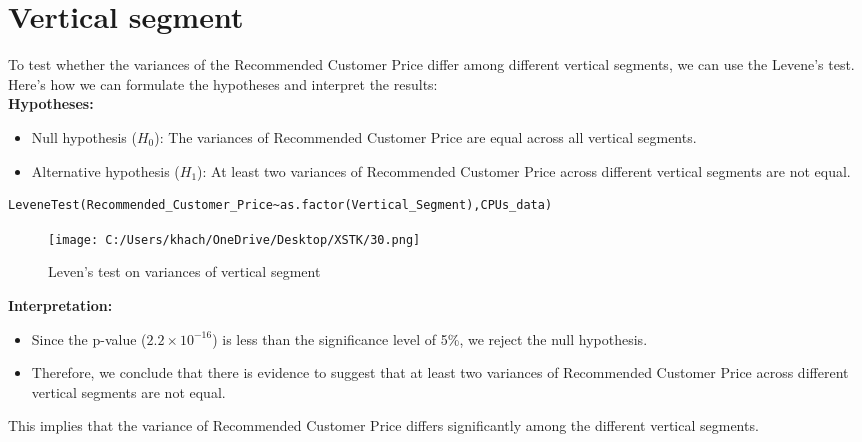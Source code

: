 \documentclass[a4paper]{article}
\begin{document}
	\section*{Vertical segment}
	 To test whether the variances of the Recommended Customer Price differ among different vertical segments, we can use the Levene's test. Here's how we can formulate the hypotheses and interpret the results:\\
	 \textbf{Hypotheses:}
	 \begin{itemize}
	 	\item Null hypothesis (\( H_0 \)): The variances of Recommended Customer Price are equal across all vertical segments.
	 	\item Alternative hypothesis (\( H_1 \)): At least two variances of Recommended Customer Price across different vertical segments are not equal.
	 \end{itemize}
	 \begin{lstlisting}[frame=single, backgroundcolor=\color{gray!10}, breaklines=true, columns=fullflexible]
	 LeveneTest(Recommended_Customer_Price~as.factor(Vertical_Segment),CPUs_data)
	 \end{lstlisting}
	 \begin{figure}[htbp]
	 	\centering
	 	\begin{adjustbox}{width=0.7\textwidth, frame}
	 		\texttt{[image: C:/Users/khach/OneDrive/Desktop/XSTK/30.png]}
	 	\end{adjustbox}
	 	\captionsetup{justification=centering}
	 	\vspace{0.5cm}
	 	\caption{Leven's test on variances of vertical segment}
	 \end{figure}
	 \textbf{Interpretation:}
	 \begin{itemize}
	 	\item Since the p-value (\(2.2 \times 10^{-16}\)) is less than the significance level of 5\%, we reject the null hypothesis.
	 	\item Therefore, we conclude that there is evidence to suggest that at least two variances of Recommended Customer Price across different vertical segments are not equal.
	 \end{itemize}
	 
	 This implies that the variance of Recommended Customer Price differs significantly among the different vertical segments.
\end{document}
